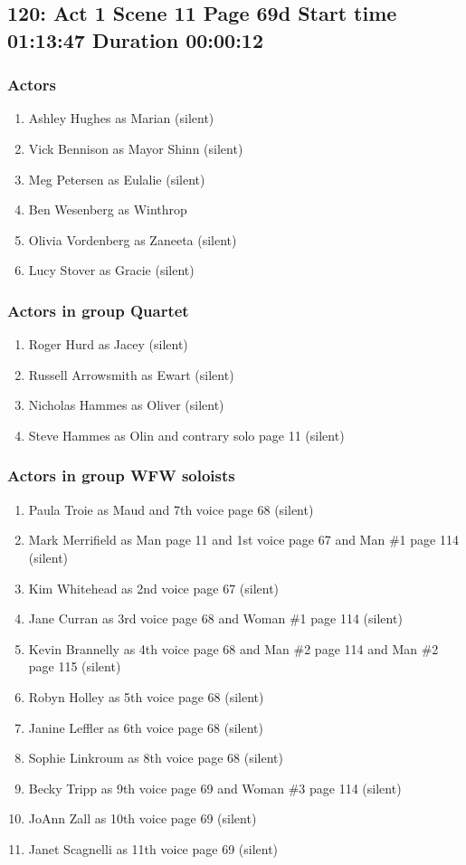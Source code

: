 \subsection{120: Act 1 Scene 11 Page 69d Start time 01:13:47 Duration 00:00:12}

\subsubsection{Actors}
\begin{enumerate}
\item Ashley Hughes as Marian (silent)
\item Vick Bennison as Mayor Shinn (silent)
\item Meg Petersen as Eulalie (silent)
\item Ben Wesenberg as Winthrop
\item Olivia Vordenberg as Zaneeta (silent)
\item Lucy Stover as Gracie (silent)
\end{enumerate}
\subsubsection{Actors in group Quartet}
\begin{enumerate}
\item Roger Hurd as Jacey (silent)
\item Russell Arrowsmith as Ewart (silent)
\item Nicholas Hammes as Oliver (silent)
\item Steve Hammes as Olin and contrary solo page 11 (silent)
\end{enumerate}
\subsubsection{Actors in group WFW soloists}
\begin{enumerate}
\item Paula Troie as Maud and 7th voice page 68 (silent)
\item Mark Merrifield as Man page 11 and 1st voice page 67 and Man \#1 page 114 (silent)
\item Kim Whitehead as 2nd voice page 67 (silent)
\item Jane Curran as 3rd voice page 68 and Woman \#1 page 114 (silent)
\item Kevin Brannelly as 4th voice page 68 and Man \#2 page 114 and Man \#2 page 115 (silent)
\item Robyn Holley as 5th voice page 68 (silent)
\item Janine Leffler as 6th voice page 68 (silent)
\item Sophie Linkroum as 8th voice page 68 (silent)
\item Becky Tripp as 9th voice page 69 and Woman \#3 page 114 (silent)
\item JoAnn Zall as 10th voice page 69 (silent)
\item Janet Scagnelli as 11th voice page 69 (silent)
\end{enumerate}

